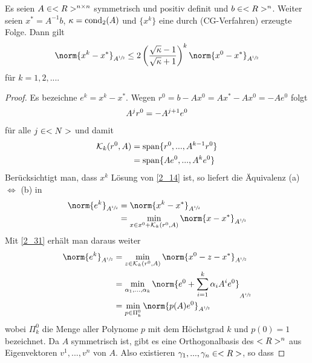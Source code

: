 \begin{proposition}
	Es seien $A\in<R>^{n \times n}$ symmetrisch und positiv definit und $b\in<R>^n$. Weiter seien $x^\ast=A^{-1}b$, $\kappa=\operatorname{cond}_2(A)$ und $\{x^k\}$ eine durch  (CG-Verfahren) erzeugte Folge. Dann gilt
	\begin{align}
		\norm{x^k-x^\ast}_{A^{\sfrac{1}{2}}} \le 2\left(\frac{\sqrt{\kappa} - 1}{\sqrt{\kappa} + 1}\right)^k\norm{x^0 - x^\ast}_{A^{\sfrac{1}{2}}}\notag
	\end{align}
	für $k=1,2,...$.
\end{proposition}
\begin{proof}
	Es bezeichne $e^k=x^k-x^\ast$. Wegen $r^0=b-Ax^0=Ax^\ast-Ax^0=-Ae^0$ folgt
	\begin{align}
		A^jr^0 = -A^{j+1}e^0\notag
	\end{align}
	für alle $j\in<N>$ und damit
	\begin{align}
		\label{2_31}
		\begin{split}
			\mathcal{K}_k(r^0,A) &= \operatorname{span}\{r^0,...,A^{k-1}r^0\} \\
			&= \operatorname{span}\{Ae^0,...,A^ke^0\}
		\end{split}
	\end{align}
	Berücksichtigt man, dass $x^k$ Lösung von \cref{2_14} ist, so liefert die Äquivalenz (a) $\Leftrightarrow$ (b) in 
	\begin{align}
		\norm{e^k}_{A^{\sfrac{1}{2}}} &= \norm{x^k-x^\ast}_{A^{\sfrac{1}{2}}} \notag \\
		&= \min_{x\in x^0+\mathcal{K}_k(r^0,A)}\norm{x-x^\ast}_{A^{\sfrac{1}{2}}} \notag 
	\end{align}
	Mit \cref{2_31} erhält man daraus weiter
	\begin{align}
		\label{2_32}
		\begin{split}
		\norm{e^k}_{A^{\sfrac{1}{2}}} &= \min_{z\in\mathcal{K}_k(r^0,A)}\norm{x^0-z-x^\ast}_{A^{\sfrac{1}{2}}} \\
		&= \min_{\alpha_1,...,\alpha_k}\norm{e^0+\sum_{i=1}^k \alpha_iA^ie^0}_{A^{\sfrac{1}{2}}} \\
		&= \min_{p\in\Pi^0_k} \norm{p(A)e^0}_{A^{\sfrac{1}{2}}}
		\end{split}
	\end{align}
	wobei $\Pi_k^0$ die Menge aller Polynome $p$ mit dem Höchstgrad $k$ und $p(0)=1$ bezeichnet. Da $A$ symmetrisch ist, gibt es eine Orthogonalbasis des $<R>^n$ aus Eigenvektoren $v^1,...,v^n$ von $A$. Also existieren $\gamma_1,...,\gamma_n\in<R>$, so dass

\end{proof}
